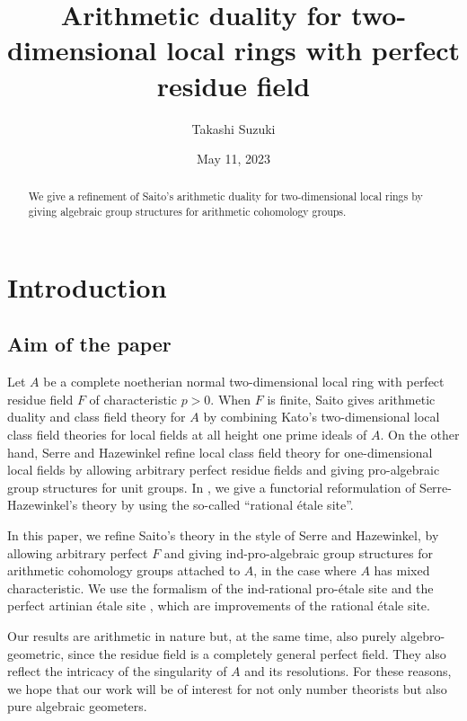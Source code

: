 \documentclass{amsart}
\title[Arithmetic duality in two-dimension]
	{Arithmetic duality for two-dimensional local rings with perfect residue field}
\author{Takashi Suzuki}
\date{May 11, 2023}
\theoremstyle{remark}
\numberwithin{equation}{subsection}
\begin{document}
\begin{abstract}
We give a refinement of Saito's arithmetic duality for two-dimensional local rings
by giving algebraic group structures for arithmetic cohomology groups.
\end{abstract}

\maketitle

\tableofcontents


\section{Introduction}
\label{0125}


\subsection{Aim of the paper}
\label{0472}

Let $A$ be a complete noetherian normal two-dimensional local ring
with perfect residue field $F$ of characteristic $p > 0$.
When $F$ is finite, Saito \cite{Sai86,Sai87} gives
arithmetic duality and class field theory for $A$
by combining Kato's two-dimensional local class field theories \cite{Kat79} for
local fields at all height one prime ideals of $A$.
On the other hand, Serre \cite{Ser61} and Hazewinkel \cite[Appendix]{DG70b} refine
local class field theory for one-dimensional local fields
by allowing arbitrary perfect residue fields
and giving pro-algebraic group structures for unit groups.
In \cite{Suz22Duality}, we give a functorial reformulation of Serre-Hazewinkel's theory
by using the so-called ``rational \'etale site''.

In this paper, we refine Saito's theory in the style of Serre and Hazewinkel,
by allowing arbitrary perfect $F$
and giving ind-pro-algebraic group structures for arithmetic cohomology groups attached to $A$,
in the case where $A$ has mixed characteristic.
We use the formalism of the ind-rational pro-\'etale site \cite{Suz20}
and the perfect artinian \'etale site \cite{Suz21},
which are improvements of the rational \'etale site.

Our results are arithmetic in nature but, at the same time, also purely algebro-geometric,
since the residue field is a completely general perfect field.
They also reflect the intricacy of the singularity of $A$ and its resolutions.
For these reasons, we hope that our work will be of interest for not only number theorists
but also pure algebraic geometers.
\end{document}
